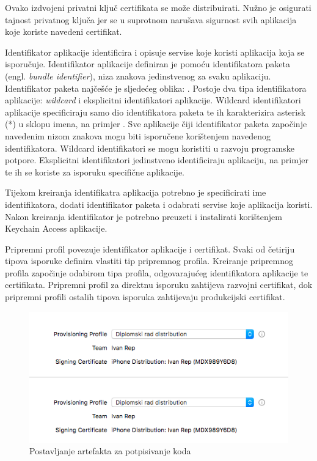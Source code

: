 \documentclass[times, utf8, diplomski, numeric]{fer}
\newcommand{\eng}[1]{(engl. \textit{#1})}
\begin{document}
Ovako izdvojeni privatni ključ certifikata se može distribuirati. Nužno je osigurati tajnost privatnog ključa jer se u suprotnom narušava sigurnost svih aplikacija koje koriste navedeni certifikat.

Identifikator aplikacije identificira i opisuje servise koje koristi aplikacija koja se isporučuje. Identifikator aplikacije definiran je pomoću identifikatora paketa \eng{bundle identifier}, niza znakova jedinstvenog za svaku aplikaciju. Identifikator paketa najčešće je  sljedećeg oblika: . Postoje dva tipa identifikatora aplikacije: \textit{wildcard} i eksplicitni identifikatori aplikacije. Wildcard identifikatori aplikacije specificiraju samo dio identifikatora paketa te ih karakterizira asterisk (*) u sklopu imena, na primjer . Sve aplikacije čiji identifikator paketa započinje navedenim nizom znakova mogu biti isporučene korištenjem navedenog identifikatora. Wildcard identifikatori se mogu koristiti u razvoju programske potpore. Eksplicitni identifikatori jedinstveno identificiraju aplikaciju, na primjer  te ih se koriste za isporuku specifične aplikacije.

Tijekom kreiranja identifikatra aplikacija potrebno je specificirati ime identifikatora, dodati identifikator paketa i odabrati servise koje aplikacija koristi. Nakon kreiranja identifikator je potrebno preuzeti i instalirati korištenjem Keychain Access aplikacije.

Pripremni profil povezuje identifikator aplikacije i certifikat. Svaki od četiriju tipova isporuke definira vlastiti tip pripremnog profila. Kreiranje pripremnog profila započinje odabirom tipa profila, odgovarajućeg identifikatora aplikacije te certifikata. Pripremni profil za direktnu isporuku zahtijeva razvojni certifikat, dok pripremni profili ostalih tipova isporuka zahtijevaju produkcijski certifikat.

\begin{figure}
\centering
\includegraphics[scale=0.6]{SigningArtefactsSetup}
\caption{Postavljanje artefakta za potpisivanje koda}
\label{fig:SigningArtefactsSetup}
\end{figure}
\end{document}
